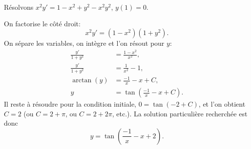 \begin{example}
	Résolvons $x^2y' = 1 - x^2+y^2 - x^2y^2$, $y(1) = 0$.

	On factorise le côté droit:
	\begin{equation*}
		x^2y' = (1 - x^2)(1+y^2) .
	\end{equation*}
	On sépare les variables, on intègre et l'on résout pour $y$:
	\begin{align*}
		\frac{y'}{1+y^2} & = \frac{1 - x^2}{x^2} , \\
		\frac{y'}{1+y^2} & = \frac{1}{x^2} - 1 , \\
		\operatorname{arctan} (y) & = \frac{-1}{x} - x + C , \\
		y & = \tan \left(\frac{-1}{x} - x + C\right) .
	\end{align*}
	Il reste à résoudre pour la condition initiale,
	 $0 = \tan(-2+C)$, et l'on obtient $C=2$ (ou $C = 2 +
	\pi$, ou $C = 2 + 2\pi$, etc.).  La solution particulière recherchée est donc
	\begin{equation*}
		y = \tan \left(\frac{-1}{x} - x + 2 \right) .
	\end{equation*}
\end{example}

